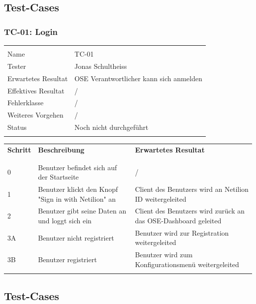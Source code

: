 \subsection{Test-Cases}
\subsubsection{TC-01: Login}
\begin{table}[H]
  \begin{tabularx}{\textwidth}{l X}\hline \\
  Name & TC-01 \\
  Tester & Jonas Schultheiss \\
  Erwartetes Resultat & OSE Verantwortlicher kann sich anmelden \\
  Effektives Resultat & / \\
  Fehlerklasse & / \\
  Weiteres Vorgehen & / \\
  Status & Noch nicht durchgeführt \\
  \\\hline
  \end{tabularx}
\end{table}
\begin{table}[H]
  \begin{tabularx}{\textwidth}{l X X}
  \textbf{Schritt} & \textbf{Beschreibung} & \textbf{Erwartetes Resultat}\\ \\\hline \\
  0 & Benutzer befindet sich auf der Startseite & / \\
  1 & Benutzer klickt den Knopf "Sign in with Netilion" an & Client des Benutzers wird an Netilion ID weitergeleited \\
  2 & Benutzer gibt seine Daten an und loggt sich ein & Client des Benutzers wird zurück an das OSE-Dashboard geleited \\
  3A & Benutzer nicht registriert & Benutzer wird zur Registration weitergeleited \\
  3B & Benutzer registriert & Benutzer wird zum Konfigurationsmenü weitergeleited \\
  \\\hline
  \end{tabularx}
\end{table}
\pagebreak
\subsection{Test-Cases}
